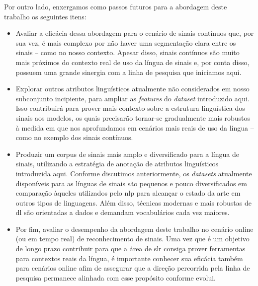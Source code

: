 Por outro lado, enxergamos como passos futuros para a abordagem deste trabalho os seguintes itens:

\begin{itemize}
    \item Avaliar a eficácia dessa abordagem para o cenário de sinais contínuos que, por sua vez, é mais complexo por não haver uma segmentação clara entre os sinais -- como no nosso contexto.
          Apesar disso, sinais contínuos são muito mais próximos do contexto real de uso da língua de sinais e, por conta disso, possuem uma grande sinergia com a linha de pesquisa que iniciamos aqui.

    \item Explorar outros atributos linguísticos atualmente não considerados em nosso subconjunto incipiente, para ampliar as \textit{features} do \textit{dataset} introduzido aqui.
          Isso contribuirá para prover mais contexto sobre a estrutura linguística dos sinais aos modelos, os quais precisarão tornar-se gradualmente mais robustos à medida em que nos aprofundamos em cenários mais reais de uso da língua -- como no exemplo dos sinais contínuos.

    \item Produzir um corpus de sinais mais amplo e diversificado para a língua de sinais, utilizando a estratégia de anotação de atributos linguísticos introduzida aqui.
          Conforme discutimos anteriormente, os \textit{datasets} atualmente disponíveis para as línguas de sinais são pequenos e pouco diversificados em comparação àqueles utilizados pelo \acrfull{nlp} para alcançar o estado da arte em outros tipos de linguagens.
          Além disso, técnicas modernas e mais robustas de \acrlong{dl} são orientadas a dados e demandam vocabulários cada vez maiores.

    \item Por fim, avaliar o desempenho da abordagem deste trabalho no cenário online (ou em tempo real) de reconhecimento de sinais.
          Uma vez que é um objetivo de longo prazo contribuir para que a área de \acrshort{slr} consiga prover ferramentas para contextos reais da língua, é importante conhecer sua eficácia também para cenários online afim de assegurar que a direção percorrida pela linha de pesquisa permanece alinhada com esse propósito conforme evolui.
\end{itemize}



